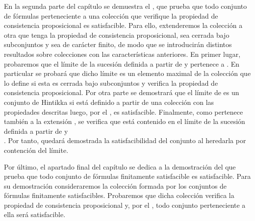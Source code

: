\begin{isabellebody}
\begin{isamarkuptext}
  En la segunda parte del capítulo se demuestra el , que prueba que todo conjunto de fórmulas  perteneciente a una 
  colección  que verifique la propiedad de consistencia proposicional es 
  satisfacible. Para ello, extenderemos la colección  a otra  que 
  tenga la propiedad de consistencia proposicional, sea cerrada bajo 
  subconjuntos y sea de carácter finito, de modo que se introducirán
  distintos resultados sobre colecciones con las características anteriores. 
  En primer lugar, probaremos que el límite de la sucesión  definida a 
  partir de  y  pertenece a . En particular se probará que dicho 
  límite es un elemento maximal de la colección que lo define si esta es 
  cerrada bajo subconjuntos y verifica la propiedad de consistencia 
  proposicional. Por otra parte se demostrará que el límite de  es un 
  conjunto de Hintikka si está definido a partir de una colección  con 
  las propiedades descritas luego, por el , es
  satisfacible. Finalmente, como  pertenece también a la extensión , 
  se verifica que está contenido en el límite de la sucesión  definida a 
  partir de  y\\ . Por tanto, quedará demostrada la satisfacibilidad 
  del conjunto  al heredarla por contención del límite.

  Por último, el apartado final del capítulo se dedica a la demostración del 
   que prueba que todo conjunto de fórmulas finitamente 
  satisfacible es satisfacible. Para su demostración consideraremos la 
  colección formada por los conjuntos de fórmulas finitamente satisfacibles. 
  Probaremos que dicha colección verifica la propiedad de consistencia 
  proposicional y, por el , todo conjunto 
  perteneciente a ella será satisfacible. 


\end{isamarkuptext}
\end{isabellebody}
